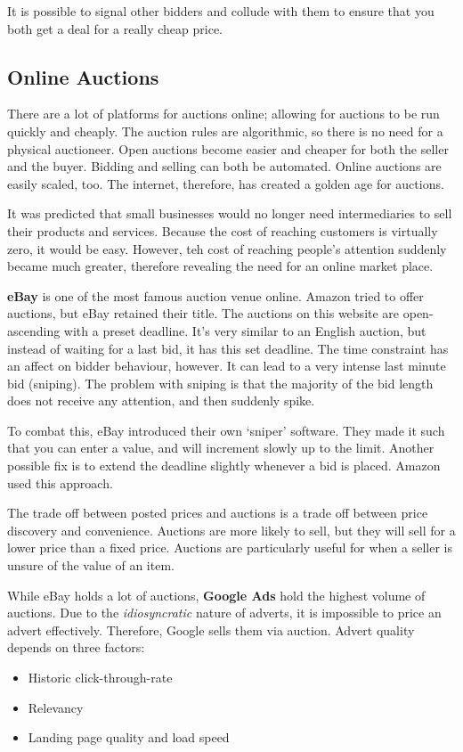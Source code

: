 \documentclass[11pt,a4paper,titlepage,dvipsnames,cmyk]{scrartcl}
\begin{document}
It is possible to signal other bidders and collude with them to ensure that you both get a deal for a really cheap price.

\subsection{Online Auctions}
There are a lot of platforms for auctions online; allowing for auctions to be run quickly and cheaply. The auction rules are algorithmic, so there is no need for a physical auctioneer. Open auctions become easier and cheaper for both the seller and the buyer. Bidding and selling can both be automated. Online auctions are easily scaled, too. The internet, therefore, has created a golden age for auctions.

It was predicted that small businesses would no longer need intermediaries to sell their products and services. Because the cost of reaching customers is virtually zero, it would be easy. However, teh cost of reaching people's attention suddenly became much greater, therefore revealing the need for an online market place.

\textbf{eBay} is one of the most famous auction venue online. Amazon tried to offer auctions, but eBay retained their title. The auctions on this website are open-ascending with a preset deadline. It's very similar to an English auction, but instead of waiting for a last bid, it has this set deadline. The time constraint has an affect on bidder behaviour, however. It can lead to a very intense last minute bid (sniping). The problem with sniping is that the majority of the bid length does not receive any attention, and then suddenly spike.

To combat this, eBay introduced their own `sniper' software. They made it such that you can enter a value, and will increment slowly up to the limit. Another possible fix is to extend the deadline slightly whenever a bid is placed. Amazon used this approach.

The trade off between posted prices and auctions is a trade off between price discovery and convenience. Auctions are more likely to sell, but they will sell for a lower price than a fixed price. Auctions are particularly useful for when a seller is unsure of the value of an item.

While eBay holds a lot of auctions, \textbf{Google Ads} hold the highest volume of auctions. Due to the \textit{idiosyncratic} nature of adverts, it is impossible to price an advert effectively. Therefore, Google sells them via auction. Advert quality depends on three factors:
\begin{itemize}
    \item Historic click-through-rate
    \item Relevancy
    \item Landing page quality and load speed
\end{itemize}
\end{document}
